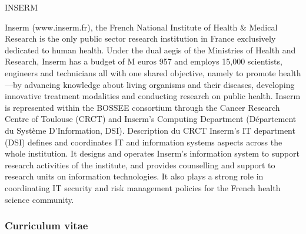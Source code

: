 \begin{sitedescription}{INSERM}

Inserm (www.inserm.fr), the French National Institute of Health \& Medical
    Research is the only public sector research institution in France
    exclusively dedicated to human health. Under the dual aegis of the
    Ministries of Health and Research, Inserm has a budget of M euros 957 and
    employs 15,000 scientists, engineers and technicians all with one shared
    objective, namely to promote health—by advancing knowledge about living
    organisms and their diseases, developing innovative treatment modalities
    and conducting research on public health.  Inserm is represented within the
    BOSSEE consortium through the Cancer Research Centre of Toulouse (CRCT) and
    Inserm’s Computing Department (D\'epartement du Système D’Information,
    DSI).
Description du CRCT
Inserm's IT department (DSI) defines and coordinates IT and information systems
    aspects across the whole institution. It designs and operates Inserm's
    information system to support research activities of the institute, and
    provides counselling and support to research units on information
    technologies.  It also plays a strong role in coordinating IT security and
    risk management policies for the French health science community.

%

\subsubsection*{Curriculum vitae}


%
%
%



\end{sitedescription}
